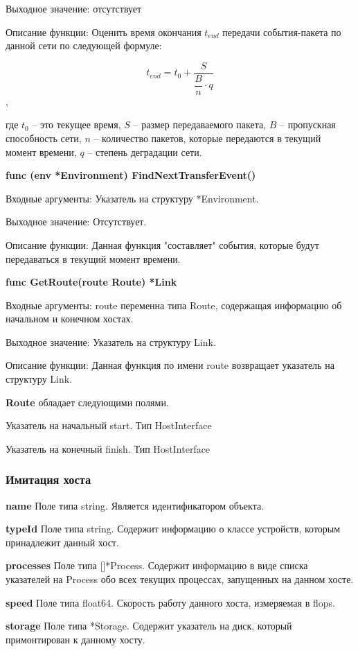 Выходное значение: отсутствует

Описание функции: Оценить время окончания  $t_{end}$ передачи события-пакета по данной сети по следующей формуле:

\[ t_{end} = t_0 + \dfrac{S}{\dfrac{B}{n}  \cdot q }  \], 

где $t_0$ -- это текущее время, \(S\) -- размер передаваемого пакета,  \(B\) -- пропускная способность сети, \(n\) -- количество пакетов, которые передаются в текущий момент времени,  \(q\) -- степень деградации сети. 


\textbf{func (env *Environment) FindNextTransferEvent()}

Входные аргументы: Указатель на структуру *Environment.

Выходное значение: Отсутствует. 

Описание функции: Данная функция "составляет" события, которые будут передаваться в текущий момент времени.  


\textbf{func GetRoute(route Route) *Link}

Входные аргументы: route переменна типа Route, содержащая информацию об начальном и конечном хостах.

Выходное значение: Указатель на структуру Link. 

Описание функции: Данная функция по имени route возвращает указатель на структуру Link.


\textbf{Route} обладает следующими полями.

Указатель на начальный	start. Тип  HostInterface

Указатель на конечный finish. Тип HostInterface



\subsubsection{Имитация хоста}
\textbf{name}      
Поле типа string. Является идентификатором объекта.  

\textbf{typeId} 
Поле типа string. Содержит информацию о классе устройств, которым принадлежит данный хост. 

\textbf{processes} 
Поле типа []*Process. Содержит информацию в виде списка указателей на Process обо всех текущих процессах, запущенных на данном хосте. 

\textbf{speed}     
Поле типа float64. Скорость работу данного хоста, измеряемая в flops.

\textbf{storage}   
Поле типа *Storage. Содержит указатель на диск, который примонтирован к данному хосту.

